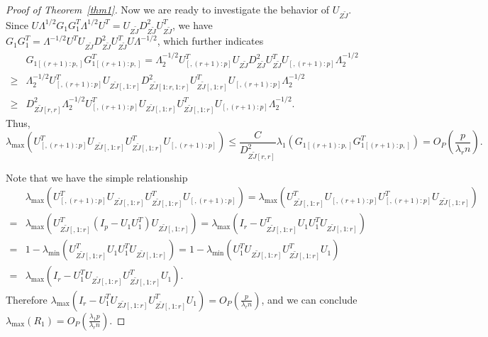 \documentclass[review]{elsarticle}
\theoremstyle{plain}
\theoremstyle{definition}
\theoremstyle{remark}
\begin{document}
\begin{proof}[\textrm{Proof of Theorem~\ref{thm1}}]
Now we are ready to investigate the behavior of $U_{Z\tilde{J}}$.
Since
$
U\Lambda^{1/2} G_1 G_1^T \Lambda^{1/2} U^T 
    =U_{Z\tilde{J}}D_{Z\tilde{J}}^2 U_{Z\tilde{J}}^T
$,
we have
$
G_1 G_1^T  
    =\Lambda^{-1/2} U^T U_{Z\tilde{J}}D_{Z\tilde{J}}^2 U_{Z\tilde{J}}^TU\Lambda^{-1/2}
$, which further indicates
$$
\begin{aligned}
    &G_{1[(r+1):p,]} G_{1[(r+1):p,]}^T  
    =\Lambda_{2}^{-1/2} U_{[,(r+1):p]}^T U_{Z\tilde{J}}D_{Z\tilde{J}}^2 U_{Z\tilde{J}}^T U_{[,(r+1):p]}\Lambda_{2}^{-1/2}\\
    \geq&
    \Lambda_{2}^{-1/2} U_{[,(r+1):p]}^T U_{Z\tilde{J}[,1:r]}D_{Z\tilde{J}[1:r,1:r]}^2 U_{Z\tilde{J}[,1:r]}^T U_{[,(r+1):p]}\Lambda_{2}^{-1/2}\\
    \geq&
    D_{Z\tilde{J}[r,r]}^2
    \Lambda_{2}^{-1/2} U_{[,(r+1):p]}^T U_{Z\tilde{J}[,1:r]} U_{Z\tilde{J}[,1:r]}^T U_{[,(r+1):p]}\Lambda_{2}^{-1/2}.
\end{aligned}
$$
Thus,
$$
\lambda_{\max}(U_{[,(r+1):p]}^T U_{Z\tilde{J}[,1:r]} U_{Z\tilde{J}[,1:r]}^T U_{[,(r+1):p]})\leq 
\frac{C}{D^2_{Z\tilde{J}[r,r]}} \lambda_{1}
    (G_{1[(r+1):p,]} G_{1[(r+1):p,]}^T)
=O_P(\frac{p}{\lambda_r n}).
$$

Note that we have the simple relationship
$$
\begin{aligned}
    &\lambda_{\max}(U_{[,(r+1):p]}^T U_{Z\tilde{J}[,1:r]} U_{Z\tilde{J}[,1:r]}^T U_{[,(r+1):p]})
=
\lambda_{\max}( U_{Z\tilde{J}[,1:r]}^T U_{[,(r+1):p]}U_{[,(r+1):p]}^T U_{Z\tilde{J}[,1:r]})\\
    =&
    \lambda_{\max}( U_{Z\tilde{J}[,1:r]}^T (I_p- U_1 U_1^T) U_{Z\tilde{J}[,1:r]})=
    \lambda_{\max}(I_r- U_{Z\tilde{J}[,1:r]}^T  U_1 U_1^T U_{Z\tilde{J}[,1:r]})\\
    =&
    1-\lambda_{\min}( U_{Z\tilde{J}[,1:r]}^T  U_1 U_1^T U_{Z\tilde{J}[,1:r]})
    =
    1-\lambda_{\min}(U_1^T U_{Z\tilde{J}[,1:r]}U_{Z\tilde{J}[,1:r]}^T U_1)\\
    =&
    \lambda_{\max}(I_r-U_1^T U_{Z\tilde{J}[,1:r]}U_{Z\tilde{J}[,1:r]}^T U_1).
\end{aligned}
$$
Therefore 
    $
    \lambda_{\max}(I_r-U_1^T U_{Z\tilde{J}[,1:r]}U_{Z\tilde{J}[,1:r]}^T U_1)
=O_P(\frac{ p}{\lambda_r n})
    $, and we can conclude
$\lambda_{\max}(R_1)=O_P(\frac{\lambda_1 p}{\lambda_r n})$.


\end{proof}
\end{document}
